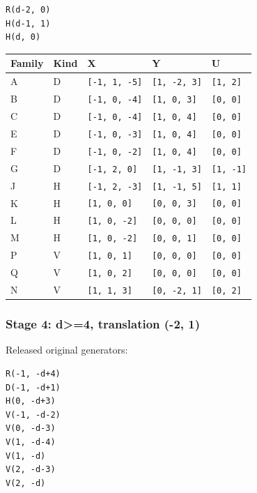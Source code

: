 \documentclass[
  10pt,
]{scrreprt}
\begin{document}
\begin{verbatim}
R(d-2, 0)
H(d-1, 1)
H(d, 0)
\end{verbatim}

\begin{longtable}[]{@{}lllll@{}}
\toprule\noalign{}
Family & Kind & X & Y & U \\
\midrule\noalign{}
\endhead
\bottomrule\noalign{}
\endlastfoot
A & D & \texttt{{[}-1,\ 1,\ -5{]}} & \texttt{{[}1,\ -2,\ 3{]}} &
\texttt{{[}1,\ 2{]}} \\
B & D & \texttt{{[}-1,\ 0,\ -4{]}} & \texttt{{[}1,\ 0,\ 3{]}} &
\texttt{{[}0,\ 0{]}} \\
C & D & \texttt{{[}-1,\ 0,\ -4{]}} & \texttt{{[}1,\ 0,\ 4{]}} &
\texttt{{[}0,\ 0{]}} \\
E & D & \texttt{{[}-1,\ 0,\ -3{]}} & \texttt{{[}1,\ 0,\ 4{]}} &
\texttt{{[}0,\ 0{]}} \\
F & D & \texttt{{[}-1,\ 0,\ -2{]}} & \texttt{{[}1,\ 0,\ 4{]}} &
\texttt{{[}0,\ 0{]}} \\
G & D & \texttt{{[}-1,\ 2,\ 0{]}} & \texttt{{[}1,\ -1,\ 3{]}} &
\texttt{{[}1,\ -1{]}} \\
J & H & \texttt{{[}-1,\ 2,\ -3{]}} & \texttt{{[}1,\ -1,\ 5{]}} &
\texttt{{[}1,\ 1{]}} \\
K & H & \texttt{{[}1,\ 0,\ 0{]}} & \texttt{{[}0,\ 0,\ 3{]}} &
\texttt{{[}0,\ 0{]}} \\
L & H & \texttt{{[}1,\ 0,\ -2{]}} & \texttt{{[}0,\ 0,\ 0{]}} &
\texttt{{[}0,\ 0{]}} \\
M & H & \texttt{{[}1,\ 0,\ -2{]}} & \texttt{{[}0,\ 0,\ 1{]}} &
\texttt{{[}0,\ 0{]}} \\
P & V & \texttt{{[}1,\ 0,\ 1{]}} & \texttt{{[}0,\ 0,\ 0{]}} &
\texttt{{[}0,\ 0{]}} \\
Q & V & \texttt{{[}1,\ 0,\ 2{]}} & \texttt{{[}0,\ 0,\ 0{]}} &
\texttt{{[}0,\ 0{]}} \\
N & V & \texttt{{[}1,\ 1,\ 3{]}} & \texttt{{[}0,\ -2,\ 1{]}} &
\texttt{{[}0,\ 2{]}} \\
\end{longtable}

\subsubsection{Stage 4: d\textgreater=4, translation (-2,
1)}\label{edition-7-section-17}

Released original generators:

\begin{verbatim}
R(-1, -d+4)
D(-1, -d+1)
H(0, -d+3)
V(-1, -d-2)
V(0, -d-3)
V(1, -d-4)
V(1, -d)
V(2, -d-3)
V(2, -d)
\end{verbatim}
\end{document}
